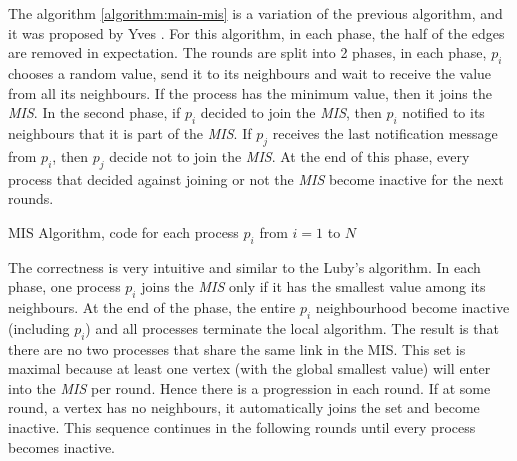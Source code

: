 The algorithm \ref{algorithm:main-mis} is a variation of the previous algorithm, and it was proposed by Yves \cite{yves2009optimal}. For this algorithm, in each phase, the half of the edges are removed in expectation. The rounds are split into 2 phases, in each phase, $p_i$ chooses a random value, send it to its neighbours and wait to receive the value from all its neighbours. If the process has the minimum value, then it joins the \textit{MIS}. In the second phase, if $p_i$ decided to join the \textit{MIS}, then $p_i$ notified to its neighbours that it is part of the \textit{MIS}. If $p_j$ receives the last notification message from $p_i$, then $p_j$ decide not to join the \textit{MIS}. At the end of this phase, every process that decided against joining or not the \textit{MIS} become inactive for the next rounds.


\begin{algorithm}
 \caption{MIS Algorithm, code for each process $p_i$ from $i = 1$ to $N$}
 \label{algorithm:main-mis} 

\SetAlgoNoLine
{}
\end{algorithm}


The correctness is very intuitive and similar to the Luby's algorithm. In each phase, one process $p_i$ joins the \textit{MIS} only if it has the smallest value among its neighbours. At the end of the phase, the entire $p_i$ neighbourhood become inactive (including $p_i$) and all processes terminate the local algorithm. The result is that there are no two processes that share the same link in the MIS. This set is maximal because at least one vertex (with the global smallest value) will enter into the \textit{MIS} per round. Hence there is a progression in each round. If at some round, a vertex has no neighbours, it automatically joins the set and become inactive. This sequence continues in the following rounds until every process becomes inactive.



